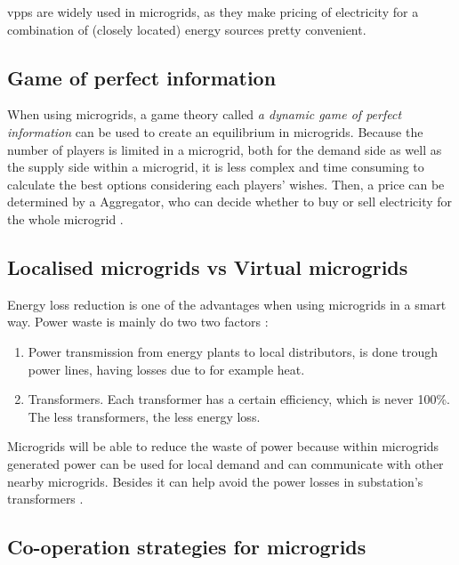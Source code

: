 \glspl{vpp} are widely used in microgrids, as they make pricing of electricity for a combination of (closely located) energy sources pretty convenient. 

\subsection{Game of perfect information}
When using microgrids, a game theory called \emph{a dynamic game of perfect information}  can be used to create an equilibrium in microgrids. Because the number of players is limited in a microgrid, both for the demand side as well as the supply side within a microgrid, it is less complex and time consuming to calculate the best options considering each players' wishes. Then, a price can be determined by a Aggregator, who can decide whether to buy or sell electricity for the whole microgrid \cite{MicrogridModellingPetrosAristidou}.

\subsection{Localised microgrids vs Virtual microgrids}
Energy loss reduction is one of the advantages when using microgrids in a smart way. Power waste is mainly do two two factors \cite{EnergyLossURL}: 

\begin{enumerate}
\item Power transmission from energy plants to local distributors, is done trough power lines, having losses due to for example heat.
\item Transformers. Each transformer has a certain efficiency, which is never 100\%. The less transformers, the less energy loss.
\end{enumerate}

Microgrids will be able to reduce the waste of power because within microgrids generated power can be used for local demand and can communicate with other nearby microgrids. Besides it can help avoid the power losses in substation's transformers \cite{keypaper}.

\subsection{Co-operation strategies for microgrids}



